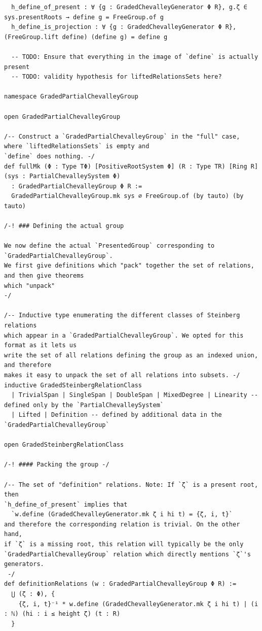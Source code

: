\documentclass[10pt,a4paper]{article}
\begin{document}
\begin{Verbatim}
  h_define_of_present : ∀ {g : GradedChevalleyGenerator Φ R}, g.ζ ∈ sys.presentRoots → define g = FreeGroup.of g
  h_define_is_projection : ∀ {g : GradedChevalleyGenerator Φ R}, (FreeGroup.lift define) (define g) = define g

  -- TODO: Ensure that everything in the image of `define` is actually present
  -- TODO: validity hypothesis for liftedRelationsSets here?

namespace GradedPartialChevalleyGroup

open GradedPartialChevalleyGroup

/-- Construct a `GradedPartialChevalleyGroup` in the "full" case, where `liftedRelationsSets` is empty and
`define` does nothing. -/
def fullMk (Φ : Type TΦ) [PositiveRootSystem Φ] (R : Type TR) [Ring R] (sys : PartialChevalleySystem Φ)
  : GradedPartialChevalleyGroup Φ R :=
  GradedPartialChevalleyGroup.mk sys ∅ FreeGroup.of (by tauto) (by tauto)

/-! ### Defining the actual group

We now define the actual `PresentedGroup` corresponding to `GradedPartialChevalleyGroup`.
We first give definitions which "pack" together the set of relations, and then give theorems
which "unpack"
-/

/-- Inductive type enumerating the different classes of Steinberg relations
which appear in a `GradedPartialChevalleyGroup`. We opted for this format as it lets us
write the set of all relations defining the group as an indexed union, and therefore
makes it easy to unpack the set of all relations into subsets. -/
inductive GradedSteinbergRelationClass
  | TrivialSpan | SingleSpan | DoubleSpan | MixedDegree | Linearity -- defined only by the `PartialChevalleySystem`
  | Lifted | Definition -- defined by additional data in the `GradedPartialChevalleyGroup`

open GradedSteinbergRelationClass

/-! #### Packing the group -/

/-- The set of "definition" relations. Note: If `ζ` is a present root, then
`h_define_of_present` implies that
  `w.define (GradedChevalleyGenerator.mk ζ i hi t) = {ζ, i, t}`
and therefore the corresponding relation is trivial. On the other hand,
if `ζ` is a missing root, this relation will typically be the only
`GradedPartialChevalleyGroup` relation which directly mentions `ζ`'s generators.
 -/
def definitionRelations (w : GradedPartialChevalleyGroup Φ R) :=
  ⋃ (ζ : Φ), {
    {ζ, i, t}⁻¹ * w.define (GradedChevalleyGenerator.mk ζ i hi t) | (i : ℕ) (hi : i ≤ height ζ) (t : R)
  }


\end{Verbatim}
\end{document}
